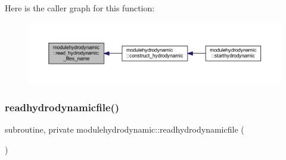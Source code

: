 Here is the caller graph for this function\+:\nopagebreak
\begin{figure}[H]
\begin{center}
\leavevmode
\includegraphics[width=350pt]{namespacemodulehydrodynamic_a38cc357414f891bddecb56ab805ed45b_icgraph}
\end{center}
\end{figure}
\mbox{\label{namespacemodulehydrodynamic_a2b422929c9c1ce1f75858893e788082f}} 
\subsubsection{\texorpdfstring{readhydrodynamicfile()}{readhydrodynamicfile()}}
{\footnotesize\ttfamily subroutine, private modulehydrodynamic\+::readhydrodynamicfile (\begin{DoxyParamCaption}{ }\end{DoxyParamCaption})\hspace{0.3cm}{\ttfamily [private]}}

